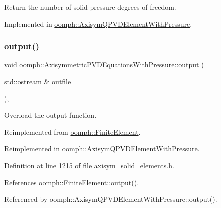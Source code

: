 Return the number of solid pressure degrees of freedom. 



Implemented in \hyperlink{classoomph_1_1AxisymQPVDElementWithPressure_ac39d97adf69f12b20640ae10aeaec156}{oomph\+::\+Axisym\+Q\+P\+V\+D\+Element\+With\+Pressure}.

\mbox{\label{classoomph_1_1AxisymmetricPVDEquationsWithPressure_aba49f4147fb78fa74cd591b4a77eab98}} 
\subsubsection{\texorpdfstring{output()}{output()}\hspace{0.1cm}{\footnotesize\ttfamily [1/4]}}
{\footnotesize\ttfamily void oomph\+::\+Axisymmetric\+P\+V\+D\+Equations\+With\+Pressure\+::output (\begin{DoxyParamCaption}\item[{std\+::ostream \&}]{outfile }\end{DoxyParamCaption})\hspace{0.3cm}{\ttfamily [inline]}, {\ttfamily [virtual]}}



Overload the output function. 



Reimplemented from \hyperlink{classoomph_1_1FiniteElement_a2ad98a3d2ef4999f1bef62c0ff13f2a7}{oomph\+::\+Finite\+Element}.



Reimplemented in \hyperlink{classoomph_1_1AxisymQPVDElementWithPressure_a1df3ba1290d73dd33634d5b99993dee7}{oomph\+::\+Axisym\+Q\+P\+V\+D\+Element\+With\+Pressure}.



Definition at line 1215 of file axisym\+\_\+solid\+\_\+elements.\+h.



References oomph\+::\+Finite\+Element\+::output().



Referenced by oomph\+::\+Axisym\+Q\+P\+V\+D\+Element\+With\+Pressure\+::output().

\mbox{\label{classoomph_1_1AxisymmetricPVDEquationsWithPressure_a6916b3f7784015c263556565b2a7219d}} 

